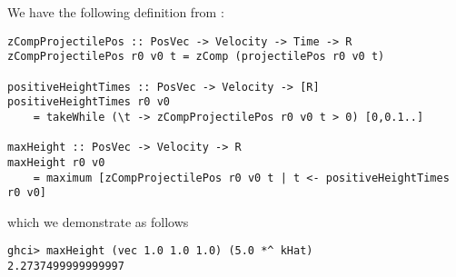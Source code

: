 
We have the following definition from :
\scriptsize\begin{verbatim}
zCompProjectilePos :: PosVec -> Velocity -> Time -> R
zCompProjectilePos r0 v0 t = zComp (projectilePos r0 v0 t)

positiveHeightTimes :: PosVec -> Velocity -> [R]
positiveHeightTimes r0 v0 
    = takeWhile (\t -> zCompProjectilePos r0 v0 t > 0) [0,0.1..]

maxHeight :: PosVec -> Velocity -> R
maxHeight r0 v0 
    = maximum [zCompProjectilePos r0 v0 t | t <- positiveHeightTimes r0 v0]
\end{verbatim}\normalsize
which we demonstrate as follows
\scriptsize\begin{verbatim}
ghci> maxHeight (vec 1.0 1.0 1.0) (5.0 *^ kHat)
2.2737499999999997
\end{verbatim}\normalsize
